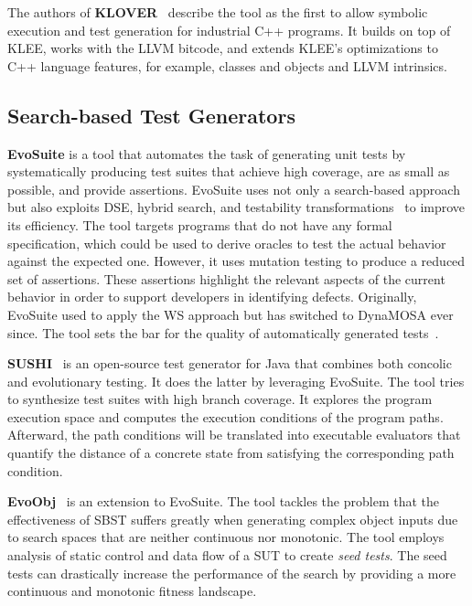 \documentclass{article}
\begin{document}
The authors of \textbf{KLOVER}~\cite{Li2011} describe the tool as the first to allow symbolic execution and test generation for industrial C++ programs. It builds on top of KLEE, works with the LLVM bitcode, and extends KLEE's optimizations to C++ language features, for example, classes and objects and LLVM intrinsics.


\subsection{Search-based Test Generators}
\textbf{EvoSuite} is a tool that automates the task of generating unit tests by systematically producing test suites that achieve high coverage, are as small as possible, and provide assertions. EvoSuite uses not only a search-based approach but also exploits \ac{DSE}, hybrid search, and testability transformations~\cite{Harman2004} to improve its efficiency. The tool targets programs that do not have any formal specification, which could be used to derive oracles to test the actual behavior against the expected one. However, it uses mutation testing to produce a reduced set of assertions. These assertions highlight the relevant aspects of the current behavior in order to support developers in identifying defects. Originally, EvoSuite used to apply the \ac{WS} approach but has switched to \ac{DynaMOSA} ever since. The tool sets the bar for the quality of automatically generated tests~\cite{Vogl2021,Panichella2020,Campos2019,Fraser2018,Fraser2016,Fraser2017}.

\textbf{SUSHI}~\cite{Braione2018} is an open-source test generator for Java that combines both concolic and evolutionary testing. It does the latter by leveraging EvoSuite. The tool tries to synthesize test suites with high branch coverage. It explores the program execution space and computes the execution conditions of the program paths. Afterward, the path conditions will be translated into executable evaluators that quantify the distance of a concrete state from satisfying the corresponding path condition.

\textbf{EvoObj}~\cite{Lin2021} is an extension to EvoSuite. The tool tackles the problem that the effectiveness of \ac{SBST} suffers greatly when generating complex object inputs due to search spaces that are neither continuous nor monotonic. The tool employs analysis of static control and data flow of a \ac{SUT} to create \textit{seed tests}. The seed tests can drastically increase the performance of the search by providing a more continuous and monotonic fitness landscape.
\end{document}
